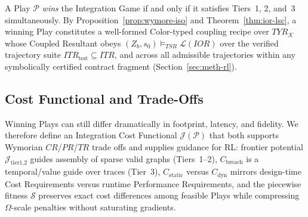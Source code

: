 A Play $\mathcal{P}$ \emph{wins} the Integration Game if and only if it satisfies Tiers~1, 2, and~3 simultaneously.  By Proposition~\ref{prop:wymore-iso} and Theorem~\ref{thm:ior-lsc}, a winning Play constitutes a well-formed Color-typed coupling recipe over $TYR_{\mathcal{K}}$ whose Coupled Resultant obeys $(Z_b, s_0) \models_{TSR} \mathcal{L}(IOR)$ over the verified trajectory suite $ITR_{\text{test}} \subseteq ITR$, and across all admissible trajectories within any symbolically certified contract fragment (Section~\ref{sec:meth-rl}).

\subsection{Cost Functional and Trade-Offs} \label{sec:meth-cost}

Winning Plays can still differ dramatically in footprint, latency, and fidelity.  We therefore define an Integration Cost Functional $\mathcal{J}(\mathcal{P})$ that both supports Wymorian $CR$/$PR$/$TR$ trade offs and supplies guidance for RL: frontier potential $\mathcal{J}_{\text{tier1,2}}$ guides assembly of sparse valid graphs (Tiers~1--2), $C_{\text{breach}}$ is a temporal/value guide over traces (Tier~3), $C_{\text{static}}$ versus $C_{\text{dyn}}$ mirrors design-time Cost Requirements versus runtime Performance Requirements, and the piecewise fitness $\mathcal{S}$ preserves exact cost differences among feasible Plays while compressing $\Omega$-scale penalties without saturating gradients.

